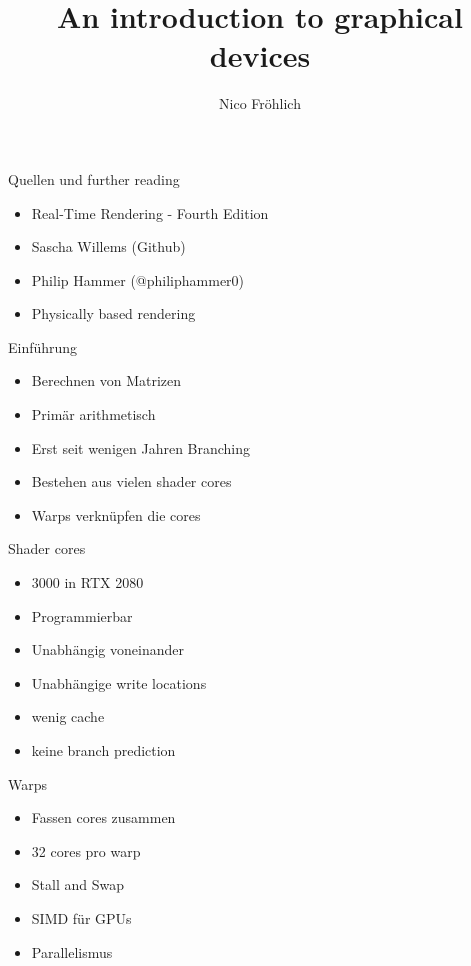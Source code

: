 \documentclass[11pt]{beamer}
\author{Nico Fröhlich}
\title{An introduction to graphical devices}
\institute{Troblecodings}
\begin{document}
\begin{frame}
\titlepage
\end{frame}

\begin{frame}{Quellen und further reading}
\begin{itemize}
\item Real-Time Rendering - Fourth Edition
\item Sascha Willems (Github)
\item Philip Hammer (@philiphammer0)
\item Physically based rendering
\end{itemize}
\end{frame}

\begin{frame}{Einführung}
\begin{itemize}
\item Berechnen von Matrizen
\item Primär arithmetisch
\item Erst seit wenigen Jahren Branching
\item Bestehen aus vielen shader cores
\item Warps verknüpfen die cores
\end{itemize}
\end{frame}

\begin{frame}{Shader cores}
\begin{itemize}
\item 3000 in RTX 2080
\item Programmierbar
\item Unabhängig voneinander
\item Unabhängige write locations
\item wenig cache
\item keine branch prediction
\end{itemize}
\end{frame}

\begin{frame}{Warps}
\begin{itemize}
\item Fassen cores zusammen
\item 32 cores pro warp
\item Stall and Swap
\item SIMD für GPUs
\item Parallelismus
\end{itemize}
\end{frame}
\end{document}
